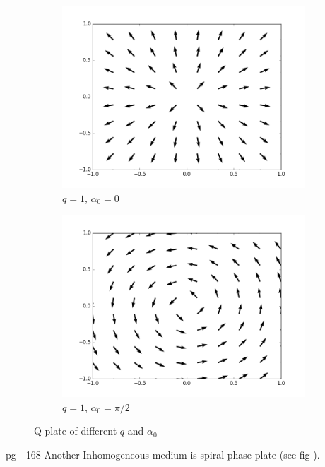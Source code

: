 \documentclass[11pt,a4paper]{article}
\numberwithin{equation}{section}
\begin{document}
\begin{figure}[H]
\begin{subfigure}[H]{0.24\textwidth}
		\includegraphics[width=\textwidth]{qplate(1).png}
		\caption{$q=1$, $\alpha_0=0$}
		\label{fig:q1}
	\end{subfigure}
	\hfil
	\begin{subfigure}[H]{0.24\textwidth}
		\centering
		\includegraphics[width=\textwidth]{qplate(1,r).png}
		\caption{$q=1$, $\alpha_0=\pi/2$}
		\label{fig:q1r}
	\end{subfigure}
	\caption{Q-plate of different $q$ and $\alpha_0$}
	\label{fig:qplate}
\end{figure}


\cite{beijer 94}
\cite{yao 11} pg - 168
Another Inhomogeneous medium is spiral phase plate (see fig \cite{beijer 94}).
\end{document}
